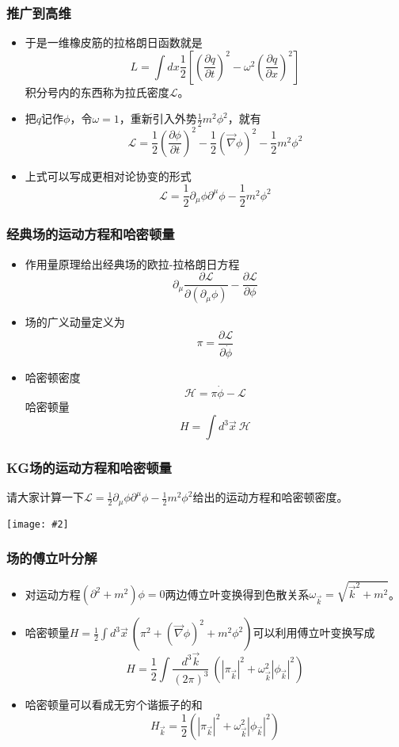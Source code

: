 \documentclass[CJK]{beamer}
\newcommand{\lag}{\mathcal{L}}
\newcommand{\ham}{\mathcal{H}}
\newcommand{\cpic}[2]{
\begin{center}
\texttt{[image: \#2]}
\end{center}
}
\begin{document}
\begin{frame}
\frametitle{\bch 推广到高维 \ech}
\bch
\begin{itemize}
\item
于是一维橡皮筋的拉格朗日函数就是
$$
L =  \int dx\frac{1}{2} \left[ \left( \frac{\partial q}{\partial t}\right)^2 - \omega^2 \left( \frac{\partial q}{\partial x} \right)^2\right]
$$
积分号内的东西称为拉氏密度$\lag$。
\item
把$q$记作$\phi$，令$\omega = 1$，重新引入外势$\frac{1}{2}m^2 \phi^2$，就有
$$
\lag = \frac{1}{2} \left( \frac{\partial \phi}{\partial t}\right)^2 - \frac{1}{2} ( \vec \nabla \phi )^2 - \frac{1}{2}m^2 \phi^2
$$
\item
上式可以写成更相对论协变的形式
$$
\lag = \frac{1}{2} \partial_\mu \phi \partial^\mu \phi - \frac{1}{2}m^2 \phi^2
$$
\end{itemize}
\ech
\end{frame}

\begin{frame}
\frametitle{\bch 经典场的运动方程和哈密顿量 \ech}
\bch
\begin{itemize}
\item
作用量原理给出经典场的欧拉-拉格朗日方程
$$
\partial_\mu \frac{\partial \lag}{\partial (\partial_\mu \phi)} - \frac{\partial \lag}{\partial \phi}
$$
\item
场的广义动量定义为
$$
\pi = \frac{\partial \lag}{\partial \dot \phi}
$$
\item
哈密顿密度
$$
\ham = \pi \dot \phi - \lag
$$
哈密顿量
$$
H = \int d^3 \vec{x} \ \ham
$$

\end{itemize}
\ech
\end{frame}

\begin{frame}
\frametitle{\bch KG场的运动方程和哈密顿量 \ech}
\bch
请大家计算一下$\lag = \frac{1}{2} \partial_\mu \phi \partial^\mu \phi - \frac{1}{2}m^2 \phi^2$给出的运动方程和哈密顿密度。
\cpic{0.2}{eat}
\ech
\end{frame}


\begin{frame}
\frametitle{\bch 场的傅立叶分解 \ech}
\bch
\begin{itemize}
\item 对运动方程$(\partial^2 + m^2)\phi = 0$两边傅立叶变换得到色散关系$\omega_{\vec k} = \sqrt{ \vec k^2 + m^2} $。
\item 哈密顿量$H = \frac{1}{2}\int d^3 \vec x \ \left( \pi^2 + (\vec \nabla \phi)^2 + m^2 \phi^2 \right)$可以利用傅立叶变换写成
$$
H = \frac{1}{2} \int \frac{d^3 \vec k }{(2\pi)^3} \ \left( |\pi_{\vec k} |^2 + \omega_{\vec{k}}^2 | \phi_{\vec k} |^2\right)
$$
\item 哈密顿量可以看成无穷个谐振子的和
$$
H_{\vec k} = \frac{1}{2} \left( |\pi_{\vec k} |^2 + \omega_{\vec{k}}^2 | \phi_{\vec k} |^2\right)
$$
\end{itemize}
\ech
\end{frame}
\end{document}
